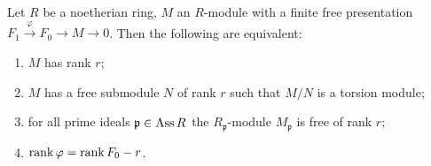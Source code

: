 \documentclass[12pt]{article}
\begin{document}
\begin{prop} \label{prop:rank-equivalences}
	Let $R$ be a noetherian ring, $M$ an $R$-module with a finite free presentation $F_{1} \xrightarrow{\varphi} F_{0} \to M \to 0$. Then the following are equivalent:
	\begin{enumerate}[label=(\alph*)]
		\item $M$ has rank $r$;
		\item $M$ has a free submodule $N$ of rank $r$ such that $M/N$ is a torsion module;
		\item for all prime ideals $\mathfrak{p} \in \operatorname{Ass} R$ the $R_{\mathfrak{p}}$-module $M_{\mathfrak{p}}$ is free of rank $r$;
		\item $\operatorname{rank} \varphi = \operatorname{rank} F_{0} - r$.
	\end{enumerate}
\end{prop}
\end{document}
